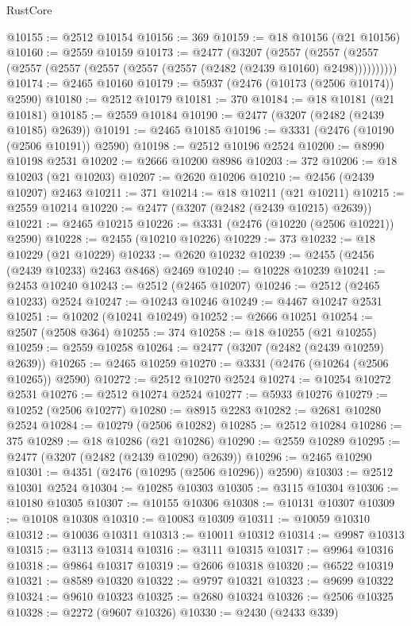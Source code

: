 \begin{lexlean}{RustCore}
\begin{coremodule}
@10155 := @2512 @10154
@10156 := 369
@10159 := @18 @10156 (@21 @10156)
@10160 := @2559 @10159
@10173 := @2477
    (@3207
      (@2557 (@2557 (@2557 (@2557 (@2557 (@2557 (@2557 (@2557 (@2482 (@2439 @10160) @2498))))))))))
@10174 := @2465 @10160
@10179 := @5937 (@2476 (@10173 (@2506 @10174)) @2590)
@10180 := @2512 @10179
@10181 := 370
@10184 := @18 @10181 (@21 @10181)
@10185 := @2559 @10184
@10190 := @2477 (@3207 (@2482 (@2439 @10185) @2639))
@10191 := @2465 @10185
@10196 := @3331 (@2476 (@10190 (@2506 @10191)) @2590)
@10198 := @2512 @10196 @2524
@10200 := @8990 @10198 @2531
@10202 := @2666 @10200 @8986
@10203 := 372
@10206 := @18 @10203 (@21 @10203)
@10207 := @2620 @10206
@10210 := @2456 (@2439 @10207) @2463
@10211 := 371
@10214 := @18 @10211 (@21 @10211)
@10215 := @2559 @10214
@10220 := @2477 (@3207 (@2482 (@2439 @10215) @2639))
@10221 := @2465 @10215
@10226 := @3331 (@2476 (@10220 (@2506 @10221)) @2590)
@10228 := @2455 (@10210 @10226)
@10229 := 373
@10232 := @18 @10229 (@21 @10229)
@10233 := @2620 @10232
@10239 := @2455 (@2456 (@2439 @10233) @2463 @8468) @2469
@10240 := @10228 @10239
@10241 := @2453 @10240
@10243 := @2512 (@2465 @10207)
@10246 := @2512 (@2465 @10233) @2524
@10247 := @10243 @10246
@10249 := @4467 @10247 @2531
@10251 := @10202 (@10241 @10249)
@10252 := @2666 @10251
@10254 := @2507 (@2508 @364)
@10255 := 374
@10258 := @18 @10255 (@21 @10255)
@10259 := @2559 @10258
@10264 := @2477 (@3207 (@2482 (@2439 @10259) @2639))
@10265 := @2465 @10259
@10270 := @3331 (@2476 (@10264 (@2506 @10265)) @2590)
@10272 := @2512 @10270 @2524
@10274 := @10254 @10272 @2531
@10276 := @2512 @10274 @2524
@10277 := @5933 @10276
@10279 := @10252 (@2506 @10277)
@10280 := @8915 @2283
@10282 := @2681 @10280 @2524
@10284 := @10279 (@2506 @10282)
@10285 := @2512 @10284
@10286 := 375
@10289 := @18 @10286 (@21 @10286)
@10290 := @2559 @10289
@10295 := @2477 (@3207 (@2482 (@2439 @10290) @2639))
@10296 := @2465 @10290
@10301 := @4351 (@2476 (@10295 (@2506 @10296)) @2590)
@10303 := @2512 @10301 @2524
@10304 := @10285 @10303
@10305 := @3115 @10304
@10306 := @10180 @10305
@10307 := @10155 @10306
@10308 := @10131 @10307
@10309 := @10108 @10308
@10310 := @10083 @10309
@10311 := @10059 @10310
@10312 := @10036 @10311
@10313 := @10011 @10312
@10314 := @9987 @10313
@10315 := @3113 @10314
@10316 := @3111 @10315
@10317 := @9964 @10316
@10318 := @9864 @10317
@10319 := @2606 @10318
@10320 := @6522 @10319
@10321 := @8589 @10320
@10322 := @9797 @10321
@10323 := @9699 @10322
@10324 := @9610 @10323
@10325 := @2680 @10324
@10326 := @2506 @10325
@10328 := @2272 (@9607 @10326)
@10330 := @2430 (@2433 @339)

\end{coremodule}
\end{lexlean}

